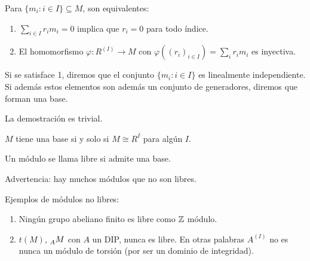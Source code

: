 \begin{lema}
  Para \(\{m_i:i\in I\}\subseteq M\), son equivalentes:
  \begin{enumerate}
    \item \(\sum_{i\in I} r_i m_i=0\) implica que \(r_i=0\) para todo índice.
    \item El homomorfismo \(\varphi:R^{(I)}\longrightarrow M\) con
      \(\varphi({(r_i)}_{i\in I})=\sum_i r_i m_i\) es inyectiva.
  \end{enumerate}
  Si se satisface 1, diremos que el conjunto \(\{m_i:i\in I\}\) es linealmente
  independiente. Si además estos elementos son además un conjunto de
  generadores, diremos que forman una base.
\end{lema}

La demostración es trivial.

\begin{obs}
  \(M\) tiene una base si y solo si \(M\cong R^I\) para algún \(I\).
\end{obs}

\begin{df}
  Un módulo se llama libre si admite una base.
\end{df}

\begin{obs}
  Advertencia: hay muchos módulos que no son libres.
\end{obs}

Ejemplos de módulos no libres:
\begin{enumerate}
  \item Ningún grupo abeliano finito es libre como \(\mathbb{Z}\) módulo.
  \item \(t(M)\), \(\prescript{}{A}{M}\) con \(A\) un DIP, nunca es libre.
    En otras palabras \(A^{(I)}\) no es nunca un módulo de torsión (por
    ser un dominio de integridad).
\end{enumerate}
